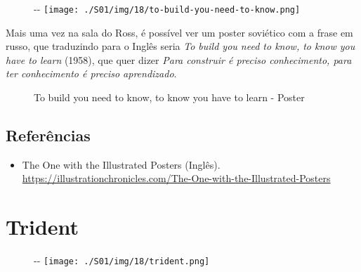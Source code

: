 \begin{figure}[!ht]
  \begin{adjustwidth}{-\oddsidemargin-1in}{-\rightmargin}
    \centering
    \texttt{[image: ./S01/img/18/to-build-you-need-to-know.png]}
  \end{adjustwidth}
\end{figure}

Mais uma vez na sala do Ross, é possível ver um poster soviético com a
frase em russo, que traduzindo para o Inglês seria \emph{To build you
need to know, to know you have to learn} (1958), que quer dizer
\emph{Para construir é preciso conhecimento, para ter conhecimento é
preciso aprendizado}.

\begin{figure}
  \centering
    \caption{To build you need to know, to know you have to learn - Poster\label{fig:to-build-you-need-to-know-to-know-you-have-to-learn-poster}}
\end{figure}

\hypertarget{referuxeancias-12}{%
\subsection{Referências}\label{referuxeancias-12}}

\begin{itemize}
\tightlist
\item
  \sloppy The One with the Illustrated Posters (Inglês). \url{https://illustrationchronicles.com/The-One-with-the-Illustrated-Posters}
\end{itemize}

\hypertarget{trident}{%
\section{Trident}\label{trident}}

\begin{figure}[!ht]
  \begin{adjustwidth}{-\oddsidemargin-1in}{-\rightmargin}
    \centering
    \texttt{[image: ./S01/img/18/trident.png]}
  \end{adjustwidth}
\end{figure}

